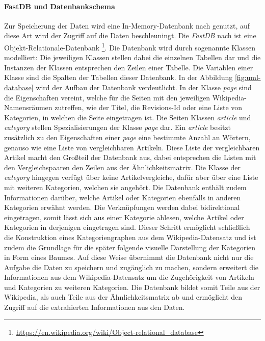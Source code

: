 \paragraph{FastDB und Datenbankschema}
Zur Speicherung der Daten wird eine In-Memory-Datenbank nach \cite{fastdb} genutzt, auf diese Art wird der Zugriff auf die Daten beschleuningt.
Die \emph{FastDB} nach \cite{fastdb} ist eine Objekt-Relationale-Datenbank \footnote{\url{https://en.wikipedia.org/wiki/Object-relational_database}}.
Die Datenbank wird durch sogenannte Klassen modelliert: Die jeweiligen Klassen stellen dabei die einzelnen Tabellen dar und die Instanzen der Klassen entsprechen den Zeilen einer Tabelle.
Die Variablen einer Klasse sind die Spalten der Tabellen dieser Datenbank.
In der Abbildung \ref{fig:uml-database} wird der Aufbau der Datenbank verdeutlicht.
In der Klasse \emph{page} sind die Eigenschaften vereint, welche für die Seiten mit den jeweiligen Wikipedia-Namensräumen zutreffen, wie der Titel, die Revisions-Id oder eine Liste von Kategorien, in welchen die Seite eingetragen ist.
Die Seiten Klassen \emph{article} und \emph{category} stellen Spezialisierungen der Klasse \emph{page} dar.
Ein \emph{article} besitzt zusätzlich zu den Eigenschaften einer \emph{page} eine bestimmte Anzahl an Wörtern, genauso wie eine Liste von vergleichbaren Artikeln.
Diese Liste der vergleichbaren Artikel macht den Großteil der Datenbank aus, dabei entsprechen die Listen mit den Vergleichspaaren den Zeilen aus der Ähnlichkeitsmatrix.
Die Klasse der \emph{category} hingegen verfügt über keine Artikelvergleiche, dafür aber über eine Liste mit weiteren Kategorien, welchen sie angehört.
Die Datenbank enthält zudem Informationen darüber, welche Artikel oder Kategorien ebenfalls in anderen Kategorien erwähnt werden.
Die Verknüpfungen werden dabei bidirektional eingetragen, somit lässt sich aus einer Kategorie ablesen, welche Artikel oder Kategorien in derjenigen eingetragen sind.
Dieser Schritt ermöglicht schließlich die Konstruktion eines Kategoriengraphen aus dem Wikipedia-Datensatz und ist zudem die Grundlage für die später folgende visuelle Darstellung der Kategorien in Form eines Baumes.
Auf diese Weise übernimmt die Datenbank nicht nur die Aufgabe die Daten zu speichern und zugänglich zu machen, sondern erweitert die Informationen aus dem Wikipedia-Datensatz um die Zugehörigkeit von Artikeln und Kategorien zu weiteren Kategorien.
Die Datenbank bildet somit Teile aus der Wikipedia, als auch Teile aus der Ähnlichkeitsmatrix ab und ermöglicht den Zugriff auf die extrahierten Informationen aus den Daten.

